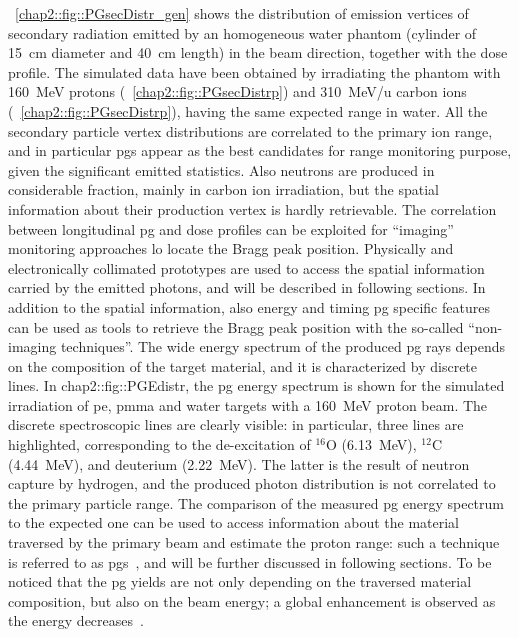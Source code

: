 \figurename~\ref{chap2::fig::PGsecDistr_gen} shows the distribution of emission vertices  of secondary radiation emitted by an homogeneous water phantom (cylinder of 15~cm diameter and 40~cm length) in the beam direction, together with the dose profile. The simulated data have been obtained by irradiating the phantom with 160~MeV protons (\figurename~\ref{chap2::fig::PGsecDistrp}) and 310~MeV/u carbon ions (\figurename~\ref{chap2::fig::PGsecDistrp}), having the same expected range in water. All the secondary particle vertex distributions are correlated to the primary ion range, and in particular \glspl{pg} appear as the best candidates for range monitoring purpose, given the significant emitted statistics. Also neutrons are produced in considerable fraction, mainly in carbon ion irradiation, but the spatial information about their production vertex is hardly retrievable.  The correlation between longitudinal \gls{pg} and dose profiles can be exploited for \enquote{imaging} monitoring approaches lo locate the Bragg peak position. Physically and electronically collimated prototypes are used to access the spatial information carried by the emitted photons, and will be described in following sections. 
In addition to the spatial information, also energy and timing \gls{pg} specific features can be used as tools to retrieve the Bragg peak position with the so-called \enquote{non-imaging techniques}. The wide energy spectrum of the produced \gls{pg} rays  depends on the composition of the target material, and it is characterized by discrete lines. In \figurename{chap2::fig::PGEdistr}, the \gls{pg} energy spectrum is shown for the simulated irradiation of \gls{pe}, \gls{pmma} and water targets with a 160~MeV proton beam. The discrete spectroscopic lines are clearly visible: in particular, three lines are highlighted, corresponding to the de-excitation of $^{16}$O (6.13~MeV), $^{12}$C (4.44~MeV), and deuterium (2.22~MeV). The latter is the result of neutron capture by hydrogen, and the produced photon distribution is not correlated to the primary particle range. The comparison of the measured \gls{pg} energy spectrum to the expected one can be used to access information about the material traversed by the primary beam and estimate the proton range: such a technique is referred to as \gls{pgs}~\parencite{Verburg2014}, and will be further discussed in following sections. To be noticed that the \gls{pg} yields are not only depending on the traversed material composition, but also on the beam energy; a global enhancement is observed as the energy decreases~\parencite{Krimmer2017}.  

